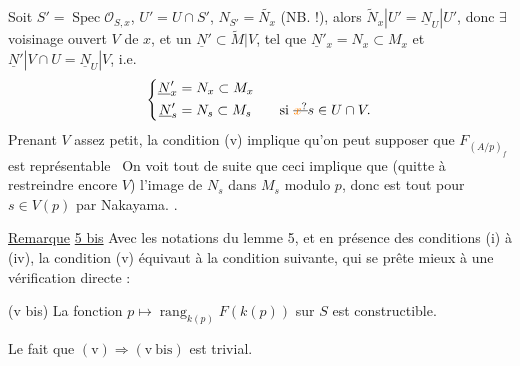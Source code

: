   Soit $S'=\operatorname{Spec}\mathcal O_{S,x}$, $U'=U\cap S'$,  $N_{S'}=\widetilde{N_x}$ (NB.  !), alors $\widetilde N_x|U'=\underline N_U|U'$, donc $\exists$ voisinage ouvert $V$ de $x$,  et un $\underline{N}'\subset\widetilde M|V$, tel que $\underline N'_x=N_x\subset M_x$ et $\underline N'|V\cap U=\underline N_U|V$, i.e.
\[
\left\{\begin{aligned}
\underline N'_x&=N_x\subset M_x\\
\underline N'_s&=N_s\subset M_s\qquad\text{si }\deleted{\unsure{x}}s\in U\cap V.
\end{aligned}\right.
\]
Prenant $V$ assez petit,    la condition (v) implique qu'on peut supposer que $F_{(A/p)_f}$ est représentable\   On voit tout de suite que ceci implique que (quitte à restreindre encore $V$) l'image de $N_s$ dans $M_s$   modulo $p$, donc est tout pour $s\in V(p)$ par Nakayama. .

\uline{Remarque} \uline{5 bis} \quad Avec les notations du lemme 5, et en présence des conditions (i) à (iv), la condition (v) équivaut à la condition suivante, qui se prête mieux à une vérification directe :

(v bis) La fonction $p\longmapsto\operatorname{rang}_{k(p)}F(k(p))$  sur $S$ est constructible. 

Le fait que $(\mathrm v)\Longrightarrow(\mathrm v\ \mathrm{bis})$ est trivial.

